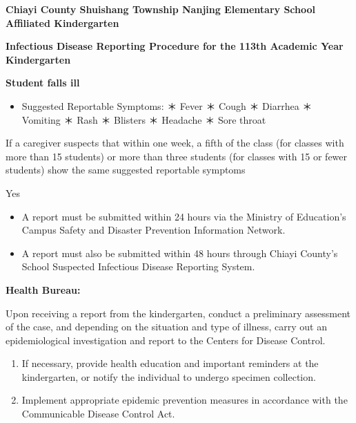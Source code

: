 \documentclass[11pt,a4paper]{article}
\begin{document}
\textbf{Chiayi County Shuishang Township Nanjing Elementary School Affiliated Kindergarten}

\textbf{Infectious Disease Reporting Procedure for the 113th Academic Year Kindergarten}

\textbf{Student falls ill}

\begin{itemize}
\item Suggested Reportable Symptoms:
＊ Fever
＊ Cough
＊ Diarrhea
＊ Vomiting
＊ Rash
＊ Blisters
＊ Headache
＊ Sore throat
\end{itemize}

\begin{figure}[h]
\end{figure}

\begin{figure}[h]
\end{figure}

If a caregiver suspects that within one week, a fifth of the class (for classes with more than 15 students) or more than three students (for classes with 15 or fewer students)
show the same suggested reportable symptoms

\begin{figure}[h]
\end{figure}

Yes

\begin{figure}[h]
\end{figure}

\begin{itemize}
\item A report must be submitted within 24 hours via the Ministry of Education’s Campus Safety and Disaster Prevention Information Network.
\item A report must also be submitted within 48 hours through Chiayi County’s School Suspected Infectious Disease Reporting System.
\end{itemize}

\begin{figure}[h]
\end{figure}

\textbf{Health Bureau:}

Upon receiving a report from the kindergarten, conduct a preliminary assessment of the case, and depending on the situation and type of illness, carry out an epidemiological investigation and report to the Centers for Disease Control.

\begin{enumerate}
\item If necessary, provide health education and important reminders at the kindergarten, or notify the individual to undergo specimen collection.
\item Implement appropriate epidemic prevention measures in accordance with the Communicable Disease Control Act.
\end{enumerate}
\end{document}
